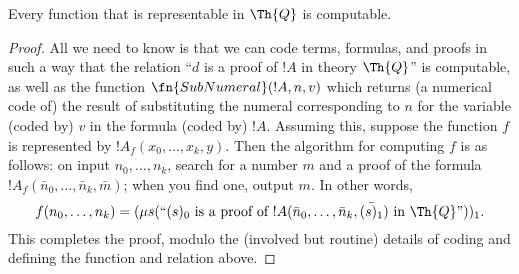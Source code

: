 \documentclass[../../include/open-logic-section]{subfiles}
\begin{document}

\begin{lem}
Every function that is representable in $\Th{Q}$ is computable.
\end{lem}

\begin{proof}
All we need to know is that we can code terms, formulas, and proofs in
such a way that the relation ``$d$ is a proof of $!A$ in theory
$\Th{Q}$'' is computable, as well as the function
$\fn{SubNumeral}(!A,n,v)$ which returns (a numerical code of) the
result of substituting the numeral corresponding to $n$ for the
variable (coded by) $v$ in the formula (coded by) $!A$. Assuming this,
suppose the function $f$ is represented by
$!A_f(x_0,\dots,x_{k},y)$. Then the algorithm for computing $f$ is as
follows: on input $n_0,\dots,n_{k}$, search for a number $m$ and a
proof of the formula $!A_f(\bar n_0,\dots,\bar n_{k},\bar m)$; when
you find one, output $m$. In other words,
\[
f(n_0,\dots,n_{k}) = (\mu s (\mbox{``$(s)_0$ is a proof of $!A(\bar
  n_0,\dots,\bar n_{k},\bar{(s)_1})$ in $\Th{Q}$''}))_1.
\]
This completes the proof, modulo the (involved but routine) details of
coding and defining the function and relation above.  
\end{proof}
\end{document}
